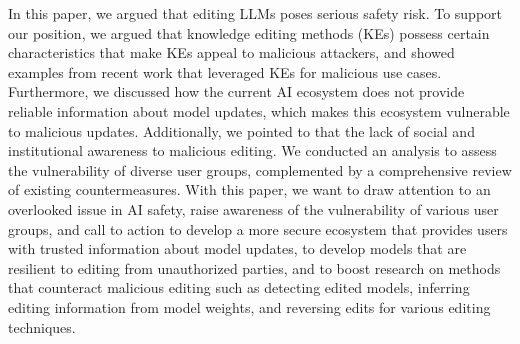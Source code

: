 


In this paper, we argued that editing LLMs poses serious safety risk. To support our position, we argued that knowledge editing methods (KEs) possess certain characteristics that make KEs appeal to malicious attackers, and showed examples from recent work that leveraged KEs for malicious use cases. Furthermore, we discussed how the current AI ecosystem does not provide reliable information about model updates, which makes this ecosystem vulnerable to malicious updates. Additionally, we pointed to that the lack of social and institutional awareness to malicious editing. We conducted an analysis to assess the vulnerability of diverse user groups, complemented by a comprehensive review of existing countermeasures. With this paper, we want to draw attention to an overlooked issue in AI safety, raise awareness of the vulnerability of various user groups, and call to action to develop a more secure ecosystem that provides users with trusted information about model updates, to develop models that are resilient to editing from unauthorized parties, and to boost research on methods that counteract malicious editing such as detecting edited models, inferring editing information from model weights, and reversing edits for various editing techniques.














